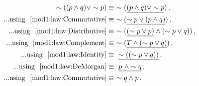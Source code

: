 \begin{subquestions}
\begin{align}	
	\sim((p \land q) \lor \sim p) 
	& \equiv ~ \sim(\underline{(p \land q) \lor \sim p}) \,, \nonumber \\
	...\text{using ~\ref{mod1:law:Commutative}}	
	& \equiv ~ \sim(\underline{\sim p \lor (p \land q)}) \,, \nonumber \\
	...\text{using ~\ref{mod1:law:Distributive}}
	& \equiv ~ \sim(\underline{(\sim p \lor p)} \land (\sim p \lor q)) \,, \nonumber \\
	...\text{using ~\ref{mod1:law:Complement}}
	& \equiv ~ \sim(\underline{T \land (\sim p \lor q)}) \,, \nonumber \\
	...\text{using ~\ref{mod1:law:Identity}}
	& \equiv ~ \underline{\sim((\sim p \lor q))} \,, \nonumber \\
	...\text{using ~\ref{mod1:law:DeMorgan}}
	& \equiv ~ \underline{ p ~\land \sim q} \,,  \nonumber \\
	...\text{using ~\ref{mod1:law:Commutative}}	
	& \equiv ~ \sim q \land p \,.
\end{align}

\end{subquestions}


